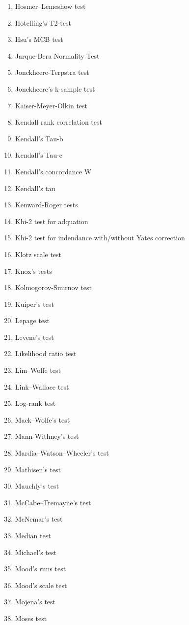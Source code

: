\begin{itemize}
\begin{multicols}{3}
\begin{enumerate}
			\item Hosmer–Lemeshow test
			\item Hotelling's T2-test 
			\item Hsu's MCB test
			\item Jarque-Bera Normality Test
			\item Jonckheere-Terpstra test
			\item Jonckheere's k-sample test
			\item Kaiser-Meyer-Olkin test
			\item Kendall rank correlation test
			\item Kendall's Tau-b
			\item Kendall's Tau-c
			\item Kendall's concordance W
			\item Kendall's tau
			\item Kenward-Roger tests
			\item Khi-2 test for adquation
			\item Khi-2 test for indendance with/without Yates correction
			\item Klotz scale test
			\item Knox's tests
			\item Kolmogorov-Smirnov test
			\item Kuiper's test
			\item Lepage test
			\item Levene's test
			\item Likelihood ratio test
			\item Lim–Wolfe test
			\item Link–Wallace test
			\item Log-rank test
			\item Mack–Wolfe's test
			\item Mann-Withney's test
			\item Mardia–Watson–Wheeler's test
			\item Mathisen's test
			\item Mauchly's test
			\item McCabe–Tremayne's test
			\item McNemar's test
			\item Median test
			\item Michael's test
			\item Mood's runs test
			\item Mood's scale test
			\item Mojena's test
			\item Moses test

\end{enumerate}
\end{multicols}
\end{itemize}
